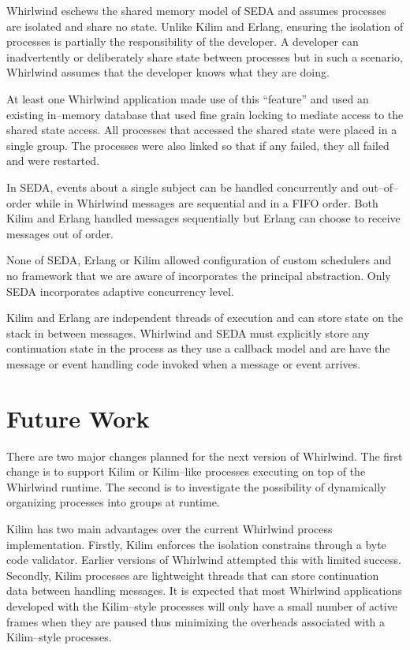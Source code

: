 \documentclass[conference]{IEEEtran}
\begin{document}
Whirlwind eschews the shared memory model of SEDA and assumes processes are isolated and share no state. Unlike Kilim and Erlang, ensuring the isolation of processes is partially the responsibility of the developer. A developer can inadvertently or deliberately share state between processes but in such a scenario, Whirlwind assumes that the developer knows what they are doing. 

At least one Whirlwind application made use of this ``feature'' and used an existing in--memory database that used fine grain locking to mediate access to the shared state access. All processes that accessed the shared state were placed in a single group. The processes were also linked so that if any failed, they all failed and were restarted.

In SEDA, events about a single subject can be handled concurrently and out--of--order while in Whirlwind messages are sequential and in a FIFO order. Both Kilim and Erlang handled messages sequentially but Erlang can choose to receive messages out of order.

None of SEDA, Erlang or Kilim allowed configuration of custom schedulers and no framework that we are aware of incorporates the principal abstraction. Only SEDA incorporates adaptive concurrency level.

Kilim and Erlang are independent threads of execution and can store state on the stack in between messages. Whirlwind and SEDA must explicitly store any continuation state in the process as they use a callback model and are have the message or event handling code invoked when a message or event arrives.

\section{Future Work}

There are two major changes planned for the next version of Whirlwind. The first change is to support Kilim or Kilim--like processes executing on top of the Whirlwind runtime. The second is to investigate the possibility of dynamically organizing processes into groups at runtime.

Kilim has two main advantages over the current Whirlwind process implementation. Firstly, Kilim enforces the isolation constrains through a byte code validator. Earlier versions of Whirlwind attempted this with limited success. Secondly, Kilim processes are lightweight threads that can store continuation data between handling messages. It is expected that most Whirlwind applications developed with the Kilim--style processes will only have a small number of active frames when they are paused thus minimizing the overheads associated with a Kilim--style processes.
\end{document}
